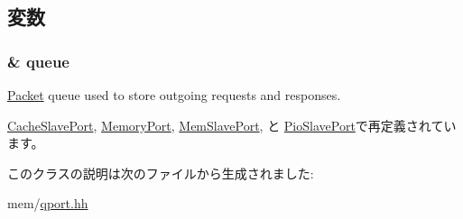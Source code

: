 \subsection{変数}
\hypertarget{classQueuedSlavePort_a89fcdbe2ab63d24f2112bc7e05bf2413}{
\subsubsection[{queue}]{\& {\bf queue}}}
\label{classQueuedSlavePort_a89fcdbe2ab63d24f2112bc7e05bf2413}
\hyperlink{classPacket}{Packet} queue used to store outgoing requests and responses. 

\hyperlink{classBaseCache_1_1CacheSlavePort_a3055168363a9ed42f38173363b6c1975}{CacheSlavePort}, \hyperlink{classDRAMCtrl_1_1MemoryPort_a3055168363a9ed42f38173363b6c1975}{MemoryPort}, \hyperlink{classRubyPort_1_1MemSlavePort_a3055168363a9ed42f38173363b6c1975}{MemSlavePort}, と \hyperlink{classRubyPort_1_1PioSlavePort_a3055168363a9ed42f38173363b6c1975}{PioSlavePort}で再定義されています。

このクラスの説明は次のファイルから生成されました:\begin{DoxyCompactItemize}
\item 
mem/\hyperlink{qport_8hh}{qport.hh}\end{DoxyCompactItemize}
